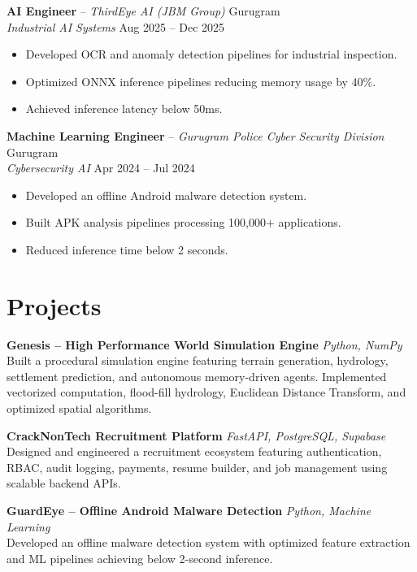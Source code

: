 \documentclass[10pt,a4paper]{article}
\begin{document}
\textbf{AI Engineer} -- \textit{ThirdEye AI (JBM Group)} \hfill Gurugram\\
\textit{Industrial AI Systems} \hfill Aug 2025 -- Dec 2025
\begin{itemize}
    \item Developed OCR and anomaly detection pipelines for industrial inspection.
    \item Optimized ONNX inference pipelines reducing memory usage by 40\%.
    \item Achieved inference latency below 50ms.
\end{itemize}

\textbf{Machine Learning Engineer} -- \textit{Gurugram Police Cyber Security Division} \hfill Gurugram\\
\textit{Cybersecurity AI} \hfill Apr 2024 -- Jul 2024
\begin{itemize}
    \item Developed an offline Android malware detection system.
    \item Built APK analysis pipelines processing 100,000+ applications.
    \item Reduced inference time below 2 seconds.
\end{itemize}

\section{Projects}

\textbf{Genesis -- High Performance World Simulation Engine} \hfill \textit{Python, NumPy}\\
Built a procedural simulation engine featuring terrain generation, hydrology, settlement prediction, and autonomous memory-driven agents. Implemented vectorized computation, flood-fill hydrology, Euclidean Distance Transform, and optimized spatial algorithms.

\vspace{3pt}
\textbf{CrackNonTech Recruitment Platform} \hfill \textit{FastAPI, PostgreSQL, Supabase}\\
Designed and engineered a recruitment ecosystem featuring authentication, RBAC, audit logging, payments, resume builder, and job management using scalable backend APIs.

\vspace{3pt}
\textbf{GuardEye -- Offline Android Malware Detection} \hfill \textit{Python, Machine Learning}\\
Developed an offline malware detection system with optimized feature extraction and ML pipelines achieving below 2-second inference.
\end{document}
